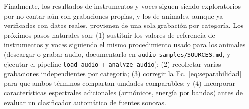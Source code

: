 Finalmente, los resultados de instrumentos y voces siguen siendo exploratorios por no contar aún con grabaciones propias, y los de animales, aunque ya verificados con datos reales, provienen de una sola grabación por categoría. Los próximos pasos naturales son: (1) sustituir los valores de referencia de instrumentos y voces siguiendo el mismo procedimiento usado para los animales (descargar o grabar audio, documentarlo en \texttt{audio\_samples/SOURCES.md}, y ejecutar el pipeline \texttt{load\_audio} + \texttt{analyze\_audio}); (2) recolectar varias grabaciones independientes por categoría; (3) corregir la Ec.~\ref{eq:separabilidad} para que ambos términos compartan unidades comparables; y (4) incorporar características espectrales adicionales (armónicos, energía por bandas) antes de evaluar un clasificador automático de fuentes sonoras.
